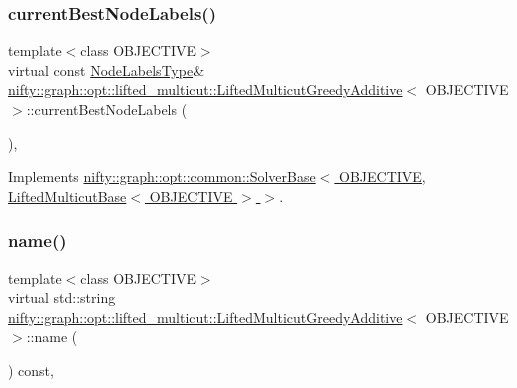 \subsubsection{\texorpdfstring{current\+Best\+Node\+Labels()}{currentBestNodeLabels()}}
{\footnotesize\ttfamily template$<$class O\+B\+J\+E\+C\+T\+I\+VE$>$ \\
virtual const \hyperlink{classnifty_1_1graph_1_1opt_1_1lifted__multicut_1_1LiftedMulticutGreedyAdditive_a67a2931a00a97fa2838ed9ae1158c7bf}{Node\+Labels\+Type}\& \hyperlink{classnifty_1_1graph_1_1opt_1_1lifted__multicut_1_1LiftedMulticutGreedyAdditive}{nifty\+::graph\+::opt\+::lifted\+\_\+multicut\+::\+Lifted\+Multicut\+Greedy\+Additive}$<$ O\+B\+J\+E\+C\+T\+I\+VE $>$\+::current\+Best\+Node\+Labels (\begin{DoxyParamCaption}{ }\end{DoxyParamCaption})\hspace{0.3cm}{\ttfamily [inline]}, {\ttfamily [virtual]}}



Implements \hyperlink{classnifty_1_1graph_1_1opt_1_1common_1_1SolverBase_a7bbe01ee201cf3157b251e54c5ff0619}{nifty\+::graph\+::opt\+::common\+::\+Solver\+Base$<$ O\+B\+J\+E\+C\+T\+I\+V\+E, Lifted\+Multicut\+Base$<$ O\+B\+J\+E\+C\+T\+I\+V\+E $>$ $>$}.

\mbox{\label{classnifty_1_1graph_1_1opt_1_1lifted__multicut_1_1LiftedMulticutGreedyAdditive_aa7320a44731a6784ec5151b4c680d4b4}} 
\subsubsection{\texorpdfstring{name()}{name()}}
{\footnotesize\ttfamily template$<$class O\+B\+J\+E\+C\+T\+I\+VE$>$ \\
virtual std\+::string \hyperlink{classnifty_1_1graph_1_1opt_1_1lifted__multicut_1_1LiftedMulticutGreedyAdditive}{nifty\+::graph\+::opt\+::lifted\+\_\+multicut\+::\+Lifted\+Multicut\+Greedy\+Additive}$<$ O\+B\+J\+E\+C\+T\+I\+VE $>$\+::name (\begin{DoxyParamCaption}{ }\end{DoxyParamCaption}) const\hspace{0.3cm}{\ttfamily [inline]}, {\ttfamily [virtual]}}



